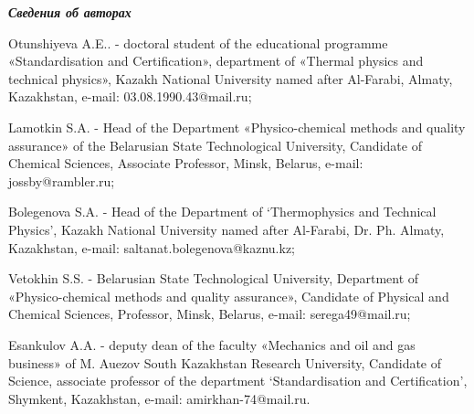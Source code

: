 \emph{{\bfseries Сведения об авторах}}

\begin{noparindent}
Otunshiyeva A.E.. - doctoral student of the educational programme
«Standardisation and Certification», department of «Thermal physics and
technical physics», Kazakh National University named after Al-Farabi,
Almaty, Kazakhstan, e-mail: 03.08.1990.43@mail.ru;

Lamotkin S.A. - Head of the Department «Physico-chemical methods and
quality assurance» of the Belarusian State Technological University,
Candidate of Chemical Sciences, Associate Professor, Minsk, Belarus,
e-mail: jossby@rambler.ru;

Bolegenova S.A. - Head of the Department of `Thermophysics and Technical
Physics', Kazakh National University named after Al-Farabi, Dr. Ph.
Almaty, Kazakhstan, e-mail: saltanat.bolegenova@kaznu.kz;

Vetokhin S.S. - Belarusian State Technological University, Department of
«Physico-chemical methods and quality assurance», Candidate of Physical
and Chemical Sciences, Professor, Minsk, Belarus, e-mail:
serega49@mail.ru;

Esankulov A.A. - deputy dean of the faculty «Mechanics and oil and gas
business» of M. Auezov South Kazakhstan Research University, Candidate
of Science, associate professor of the department `Standardisation and
Certification', Shymkent, Kazakhstan, e-mail: amirkhan-74@mail.ru.
\end{noparindent}
